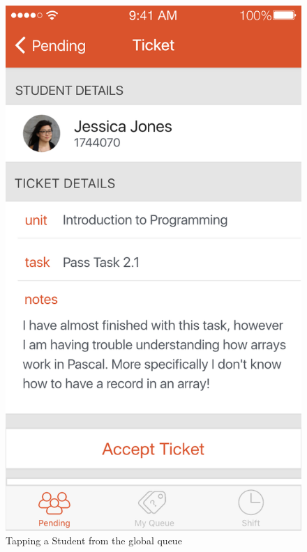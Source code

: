 \documentclass[a4paper,12pt]{article}
\begin{document}
\begin{figure}[p]
\centering
\includegraphics[scale=0.5]{72ea88c68f.png}
\caption{Tapping a Student from the global queue}
\label{8}
\end{figure}
\end{document}
